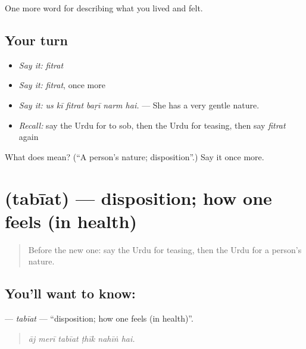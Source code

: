 \begin{grammarlens}[title={What you've built}]
One more word for describing what you lived and felt.
\end{grammarlens}

\subsection*{Your turn}
\begin{itemize}
\raggedright
  \item \emph{Say it:} \emph{fitrat}
  \item \emph{Say it:} \emph{fitrat}, once more
  \item \emph{Say it:} \emph{us kī fitrat baṛī narm hai.} — She has a very gentle nature.
  \item \emph{Recall:} say the Urdu for to sob, then the Urdu for teasing, then say \emph{fitrat} again
\end{itemize}

\begin{tcolorbox}[breakable,colback=teal!4,colframe=teal!35!black,title={Before you move on}]
What does  mean? (\textquotedblleft{}A person's nature; disposition\textquotedblright{}.) Say it once more.
\end{tcolorbox}
\section[\texorpdfstring{\ur{طبیعت} (tabīat)}{طبیعت (tabīat)}]{ (tabīat) — disposition; how one feels (in health)}

\label{lesson:UR-C454-tabiat}



\begin{quote}
Before the new one: say the Urdu for teasing, then the Urdu for a person's nature.
\end{quote}

\subsection*{You'll want to know: }
\textbf{} — \emph{tabīat} — \textquotedblleft{}disposition; how one feels (in health)\textquotedblright{}.

\begin{quote}
     
\end{quote}

\begin{quote}
\emph{āj merī tabīat ṭhīk nahīṅ hai.}
\end{quote}

